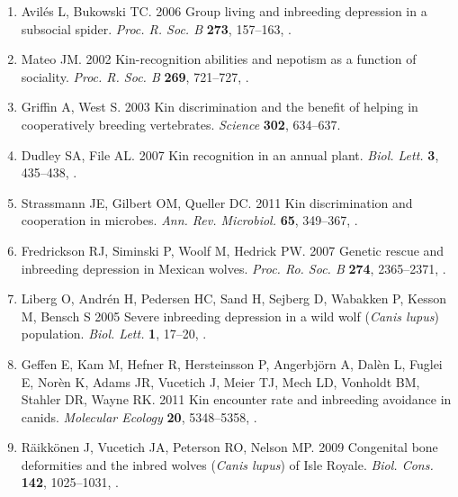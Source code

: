 \documentclass[12pt]{article}
\begin{document}
\begin{enumerate}
\item{Avil{\'{e}}s L, Bukowski TC. 2006 {Group living and inbreeding
  depression in a subsocial spider}. \textit{Proc. R. Soc.
  B} \textbf{273}, 157--163, .}

\item{Mateo JM. 2002 {Kin-recognition abilities and nepotism as a function of
  sociality}. \textit{Proc. R. Soc. B} \textbf{269},
  721--727, .}

\item{Griffin A, West S. 2003 {Kin discrimination and the benefit of helping in
  cooperatively breeding vertebrates}. \textit{Science} \textbf{302}, 634--637.}

\item{Dudley SA, File AL. 2007 {Kin recognition in an annual plant}.
  \textit{Biol. Lett.} \textbf{3}, 435--438, .}

\item{Strassmann JE, Gilbert OM, Queller DC. 2011 {Kin discrimination
  and cooperation in microbes}. \textit{Ann. Rev. Microbiol.}
  \textbf{65}, 349--367, .}

\item{Fredrickson RJ, Siminski P, Woolf M, Hedrick PW. 2007 {Genetic
  rescue and inbreeding depression in Mexican wolves.} 
  \textit{Proc. Ro. Soc. B} \textbf{274}, 2365--2371, .}

\item{Liberg O, Andr{\'{e}}n H, Pedersen HC, Sand H, Sejberg D, Wabakken
  P, Kesson M, Bensch S 2005 {Severe inbreeding depression in a wild
  wolf (\textit{Canis lupus}) population}. \textit{Biol. Lett.} \textbf{1}, 17--20,
  .}

\item{Geffen E, Kam M, Hefner R, Hersteinsson P, Angerbj{\"{o}}rn A,
  Dal{\`{e}}n L, Fuglei E, Nor{\`{e}}n K, Adams JR, Vucetich J,
  Meier TJ, Mech LD, Vonholdt BM, Stahler DR, Wayne RK.
  2011 {Kin encounter rate and inbreeding avoidance in canids}.
  \textit{Molecular Ecology} \textbf{20}, 5348--5358,
  .}

\item{R{\"{a}}ikk{\"{o}}nen J, Vucetich JA, Peterson RO, Nelson MP.
  2009 {Congenital bone deformities and the inbred wolves (\textit{Canis lupus}) of Isle
  Royale}. \textit{Biol. Cons.} \textbf{142}, 1025--1031,
  .}


\end{enumerate}
\end{document}
